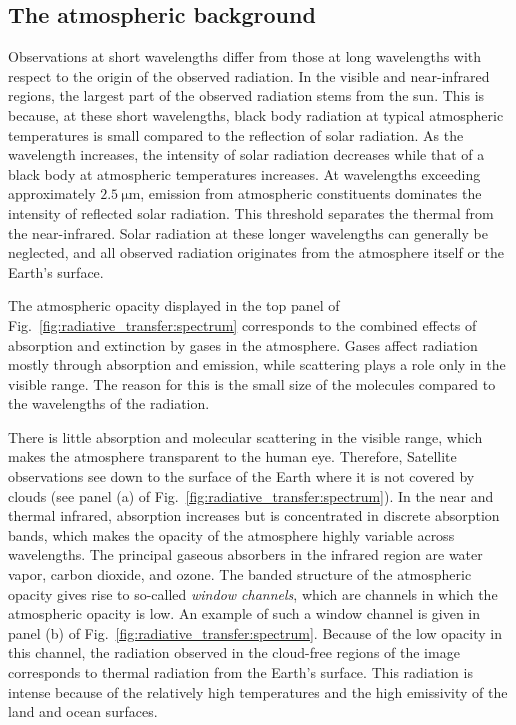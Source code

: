 \subsection{The atmospheric background}

Observations at short wavelengths differ from those at long wavelengths with
respect to the origin of the observed radiation. In the visible and
near-infrared regions, the largest part of the observed radiation stems from the
sun. This is because, at these short wavelengths, black body radiation at
typical atmospheric temperatures is small compared to the reflection of solar
radiation. As the wavelength increases, the intensity of solar radiation
decreases while that of a black body at atmospheric temperatures increases. At
wavelengths exceeding approximately $\SI{2.5}{\micro \meter}$, emission from
atmospheric constituents dominates the intensity of reflected solar radiation.
This threshold separates the thermal from the near-infrared. Solar radiation at
these longer wavelengths can generally be neglected, and all observed radiation
originates from the atmosphere itself or the Earth's surface.

The atmospheric opacity displayed in the top panel of
Fig.~\ref{fig:radiative_transfer:spectrum} corresponds to the combined effects
of absorption and extinction by gases in the atmosphere. Gases affect radiation
mostly through absorption and emission, while scattering plays a role only in
the visible range. The reason for this is the small size of the molecules
compared to the wavelengths of the radiation.

There is little absorption and molecular scattering in the visible range, which
makes the atmosphere transparent to the human eye. Therefore, Satellite
observations see down to the surface of the Earth where it is not covered by
clouds (see panel (a) of Fig.~\ref{fig:radiative_transfer:spectrum}). In the
near and thermal infrared, absorption increases but is concentrated in discrete
absorption bands, which makes the opacity of the atmosphere highly variable
across wavelengths. The principal gaseous absorbers in the infrared region are
water vapor, carbon dioxide, and ozone. The banded structure of the atmospheric
opacity gives rise to so-called \textit{window channels}, which are channels in
which the atmospheric opacity is low. An example of such a window channel is
given in panel (b) of Fig.~\ref{fig:radiative_transfer:spectrum}. Because of the
low opacity in this channel, the radiation observed in the cloud-free regions of
the image corresponds to thermal radiation from the Earth's surface. This
radiation is intense because of the relatively high temperatures and the
high emissivity of the land and ocean surfaces.


